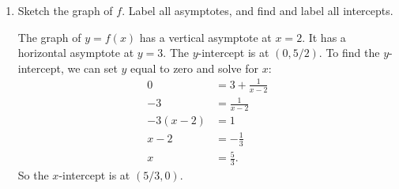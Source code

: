 \documentclass{article}
\begin{document}
\begin{enumerate}
\begin{enumerate}
    \begin{solution}
      First, let's write down the definition of the derivative. 
      \begin{align*}
        f'(1) &= \lim_{h \to 0} \frac{f(1+h)-f(1)}{h} \\
        &= \lim_{h \to 0} \frac{3 + \frac{1}{1+h-2} - 2}{h} \\
        &= \lim_{h \to 0} \frac{1 + \frac{1}{h-1}}{h} \\
        \intertext{Now we can multiply the numerator and denominator
        by $h-1$, simplify, and evaluate the limit.}
        &= \lim_{h \to 0} \frac{h-1 + 1}{h(h-1)} \\
        &= \lim_{h \to 0} \frac{1}{h-1} \\
        &= -1
      \end{align*}
    \end{solution}

  \item

    \begin{problem}[\vfill]
      Sketch the graph of $f$. Label all asymptotes, and find and label all intercepts.
    \end{problem}

    \begin{solution}
      The graph of $y=f(x)$ has a vertical asymptote at $x=2$. It has a horizontal asymptote
      at $y=3$. The $y$-intercept is at $(0, 5/2)$. To find the $y$-intercept,
      we can set $y$ equal to zero and solve for $x$:
      \begin{align*}
        0 &= 3 + \frac{1}{x-2} \\
        -3 &= \frac{1}{x-2} \\
        -3(x-2) &= 1 \\
        x-2 &= -\frac{1}{3} \\
        x &= \frac{5}{3}.
      \end{align*}
      So the $x$-intercept is at $(5/3,0)$. 

    \end{solution}


\end{enumerate}
\end{enumerate}
\end{document}
